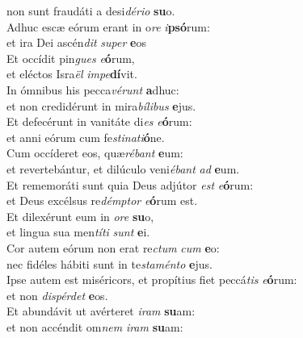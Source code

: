 \oddverse non sunt fraudáti a desi\textit{dé}\textit{ri}\textit{o} \textbf{su}o.\\
\evenverse Adhuc escæ eórum erant in o\textit{re} \textit{i}\textbf{psó}rum:~\*\\
\evenverse et ira Dei ascén\textit{dit} \textit{su}\textit{per} \textbf{e}os\\
\oddverse Et occídit pin\textit{gues} \textit{e}\textbf{ó}rum,~\*\\
\oddverse et eléctos Isra\textit{ël} \textit{im}\textit{pe}\textbf{dí}vit.\\
\evenverse In ómnibus his pecca\textit{vé}\textit{runt} \textbf{a}dhuc:~\*\\
\evenverse et non credidérunt in mira\textit{bí}\textit{li}\textit{bus} \textbf{e}jus.\\
\oddverse Et defecérunt in vanitáte di\textit{es} \textit{e}\textbf{ó}rum:~\*\\
\oddverse et anni eórum cum fe\textit{sti}\textit{na}\textit{ti}\textbf{ó}ne.\\
\evenverse Cum occíderet eos, quæ\textit{ré}\textit{bant} \textbf{e}um:~\*\\
\evenverse et revertebántur, et dilúculo veni\textit{é}\textit{bant} \textit{ad} \textbf{e}um.\\
\oddverse Et rememoráti sunt quia Deus adjútor \textit{est} \textit{e}\textbf{ó}rum:~\*\\
\oddverse et Deus excélsus re\textit{dém}\textit{ptor} \textit{e}\textbf{ó}rum est.\\
\evenverse Et dilexérunt eum in \textit{o}\textit{re} \textbf{su}o,~\*\\
\evenverse et lingua sua men\textit{tí}\textit{ti} \textit{sunt} \textbf{e}i.\\
\oddverse Cor autem eórum non erat re\textit{ctum} \textit{cum} \textbf{e}o:~\*\\
\oddverse nec fidéles hábiti sunt in te\textit{sta}\textit{mén}\textit{to} \textbf{e}jus.\\
\evenverse Ipse autem est miséricors, et propítius fiet peccá\textit{tis} \textit{e}\textbf{ó}rum:~\*\\
\evenverse et non \textit{di}\textit{spér}\textit{det} \textbf{e}os.\\
\oddverse Et abundávit ut avérteret \textit{i}\textit{ram} \textbf{su}am:~\*\\
\oddverse et non accéndit om\textit{nem} \textit{i}\textit{ram} \textbf{su}am:\\
